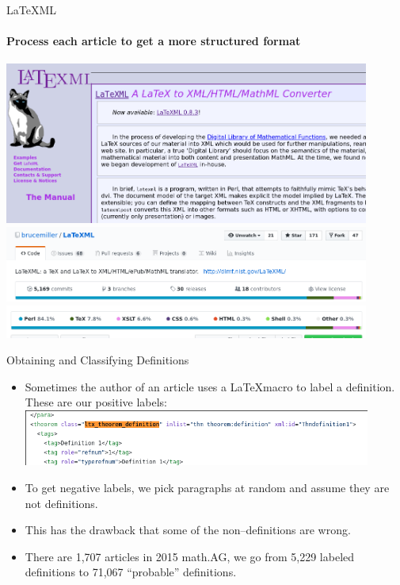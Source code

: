\documentclass{beamer}
\begin{document}
\begin{frame}{LaTeXML}
    \framesubtitle{Process each article to get a more structured format}
    \includegraphics[width=0.9\textwidth]{ltxml_website.png}
    \includegraphics[width=0.9\textwidth]{ltxml_github1.png}
    \includegraphics[width=0.9\textwidth]{ltxml_github2.png}
\end{frame}

\begin{frame}{Obtaining and Classifying Definitions}
    \begin{itemize}
            \item Sometimes the author of an article uses a \LaTeX macro to label a definition. These are our positive labels:
    \includegraphics[width=0.9\textwidth]{ltxml_defin_xml.png}
    \item To get negative labels, we pick paragraphs at random and assume they are not definitions.
        \item This has the drawback that some of the non--definitions are wrong.
    \item There are 1,707 articles in 2015 math.AG, we go from 5,229 labeled definitions to 71,067 ``probable'' definitions.  \end{itemize}
\end{frame}
\end{document}
